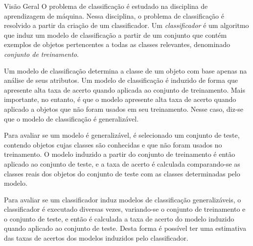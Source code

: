 \begin{section}{Visão Geral}
	O problema de classificação é estudado na disciplina de aprendizagem de máquina. Nessa disciplina, o problema de classificação é resolvido a partir da criação de um classificador. Um \emph{classificador} é um algoritmo que induz um modelo de classificação a partir de um conjunto que contém exemplos de objetos pertencentes a todas as classes relevantes, denominado \emph{conjunto de treinamento}. 

	Um modelo de classificação determina a classe de um objeto com base apenas na análise de seus atributos. Um modelo de classificação é induzido de forma que apresente alta taxa de acerto quando aplicada ao conjunto de treinamento. Mais importante, no entanto, é que o modelo apresente alta taxa de acerto quando aplicado a objetos que não foram usados em seu treinamento. Nesse caso, diz-se que o modelo de classificação é generalizável.
	
	Para avaliar se um modelo é generalizável, é selecionado um conjunto de teste, contendo objetos cujas classes são conhecidas e que não foram usados no treinamento. O modelo induzido a partir do conjunto de treinamento é então aplicado ao conjunto de teste, e a taxa de acerto é calculada comparando-se as classes reais dos objetos do conjunto de teste com as classes determinadas pelo modelo.
	
	Para avaliar se um classificador induz modelos de classificação generalizáveis, o classificador é executado diversas vezes, variando-se o conjunto de treinamento e o conjunto de teste, e então é calculada a taxa de acerto do modelo induzido quando aplicado ao conjunto de teste. Desta forma é possível ter uma estimativa das taxas de acertos dos modelos induzidos pelo classificador.
	
\end{section}	
	
